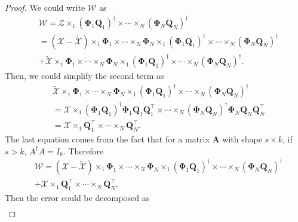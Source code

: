 \begin{proof}
We could write $\mathscr{W}$ as 
\begin{equation}
\begin{aligned}
&\mathscr{W} = \mathscr{Z}\times_1 (\mathbf{\Phi}_1 \mathbf{Q}_1)^\dag \times \cdots \times_N (\mathbf{\Phi}_N \mathbf{Q}_N)^\dag \\
& = (\mathscr{X} -  \tilde{\mathscr{X}})\times_1 \mathbf{\Phi}_1 \times \cdots \times_N \mathbf{\Phi}_N  \times_1 (\mathbf{\Phi}_1 \mathbf{Q}_1)^\dag \times \cdots \times_N (\mathbf{\Phi}_N \mathbf{Q}_N)^\dag 
\\
&+ \tilde{\mathscr{X}}\times_1 \mathbf{\Phi}_1 \times \cdots \times_N \mathbf{\Phi}_N \times_1 (\mathbf{\Phi}_1 \mathbf{Q}_1)^\dag \times \cdots \times_N (\mathbf{\Phi}_N \mathbf{Q}_N)^\dag.
\end{aligned}
\end{equation}
Then, we could simplify the second term as 
\begin{equation}
\begin{aligned}
&\tilde{\mathscr{X}}\times_1 \mathbf{\Phi}_1 \times \cdots \times_N \mathbf{\Phi}_N \times_1 (\mathbf{\Phi}_1 \mathbf{Q}_1)^\dag \times \cdots \times_N (\mathbf{\Phi}_N \mathbf{Q}_N)^\dag   \\
& = \mathscr{X}\times_1 (\mathbf{\Phi}_1 \mathbf{Q}_1)^\dag \mathbf{\Phi}_1\mathbf{Q}_1\mathbf{Q}_1^\top \times \cdots \times_N (\mathbf{\Phi}_N \mathbf{Q}_N)^\dag \mathbf{\Phi}_N\mathbf{Q}_N\mathbf{Q}_N^\top\\
& = \mathscr{X}\times_1 \mathbf{Q}_1^\top \times \cdots \times_N \mathbf{Q}_N^\top.
\end{aligned}
\end{equation}
The last equation comes from the fact that for a matrix $\mathbf{A}$ with shape $s\times k$, if $s>k$, $A^\dag A = I_k$. Therefore
\begin{equation}
\begin{aligned}
&\mathscr{W} = (\mathscr{X} -  \tilde{\mathscr{X}})\times_1 \mathbf{\Phi}_1 \times \cdots \times_N \mathbf{\Phi}_N  \times_1 (\mathbf{\Phi}_1 \mathbf{Q}_1)^\dag \times \cdots \times_N (\mathbf{\Phi}_N \mathbf{Q}_N)^\dag \\
&+ \mathscr{X}\times_1 \mathbf{Q}_1^\top \times \cdots \times_N \mathbf{Q}_N^\top.
\end{aligned}
\end{equation}
Then the error could be decomposed as 
\begin{equation}
\label{eq:core_err_decom}
\begin{aligned}

\end{aligned}
\end{equation}
\end{proof}
